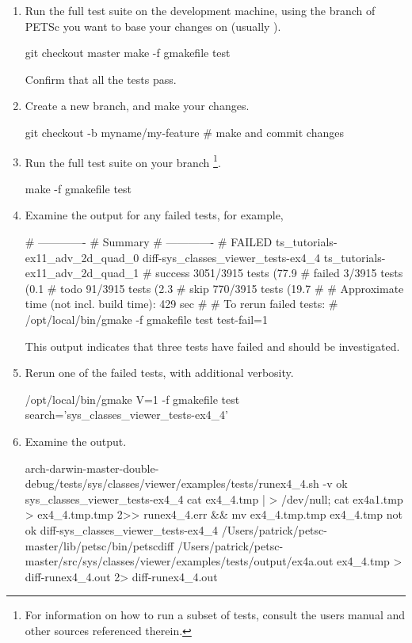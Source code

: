 \begin{enumerate}
\item Run the full test suite on the development machine, using the branch of PETSc you want to base your changes on (usually ).
\begin{bashlisting}
git checkout master
make -f gmakefile test
\end{bashlisting}
Confirm that all the tests pass.
\item Create a new branch, and make your changes.
\begin{bashlisting}
git checkout -b myname/my-feature
# make and commit changes
\end{bashlisting}
\item Run the full test suite on your branch \footnote{For information on how to run a subset of tests, consult the users manual and other sources referenced therein.}.
\begin{bashlisting}
make -f gmakefile test
\end{bashlisting}
\item Examine the output for any failed tests, for example,
\begin{outputlisting}
# -------------
#   Summary
# -------------
# FAILED ts_tutorials-ex11_adv_2d_quad_0 diff-sys_classes_viewer_tests-ex4_4 ts_tutorials-ex11_adv_2d_quad_1
# success 3051/3915 tests (77.9%
# failed 3/3915 tests (0.1%
# todo 91/3915 tests (2.3%
# skip 770/3915 tests (19.7%
#
# Approximate time (not incl. build time): 429 sec
#
# To rerun failed tests:
#     /opt/local/bin/gmake -f gmakefile test test-fail=1
\end{outputlisting}
This output indicates that three tests have failed and should be investigated.
\item Rerun one of the failed tests, with additional verbosity.
\begin{bashlisting}
/opt/local/bin/gmake V=1 -f gmakefile test search='sys_classes_viewer_tests-ex4_4'
\end{bashlisting}
\item Examine the output.
\begin{outputlisting}
arch-darwin-master-double-debug/tests/sys/classes/viewer/examples/tests/runex4_4.sh  -v
ok sys_classes_viewer_tests-ex4_4 cat ex4_4.tmp | > /dev/null; cat ex4a1.tmp > ex4_4.tmp.tmp 2>> runex4_4.err && mv ex4_4.tmp.tmp ex4_4.tmp
not ok diff-sys_classes_viewer_tests-ex4_4 /Users/patrick/petsc-master/lib/petsc/bin/petscdiff  /Users/patrick/petsc-master/src/sys/classes/viewer/examples/tests/output/ex4a.out ex4_4.tmp > diff-runex4_4.out 2> diff-runex4_4.out

\end{outputlisting}
\end{enumerate}

